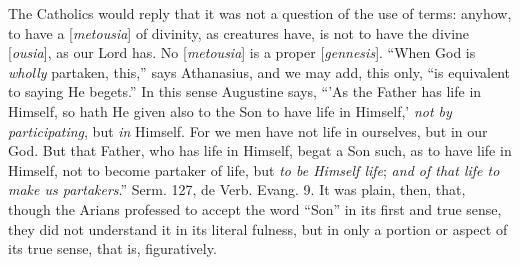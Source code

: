 The Catholics would reply that it was not a
question of the use of terms: anyhow, to have a [\emph{metousia}] of
divinity, as creatures have, is not to have the divine [\emph{ousia}],
as our Lord has. No [\emph{metousia}] is a proper [\emph{gennesis}]. ``When
God is \emph{wholly} partaken, this,'' says Athanasius, and we may add,
this only, ``is equivalent to saying He begets.'' In this sense
Augustine says, ``'As the Father has life in Himself, so hath He given
also to the Son to have life in Himself,' \emph{not by participating},
but \emph{in} Himself. For we men have not life in ourselves, but in
our God. But that Father, who has life in Himself, begat a Son such,
as to have life in Himself, not to become partaker of life, but \emph{to
be Himself life}; \emph{and of that life to make us partakers}.''
Serm. 127, de Verb. Evang. 9. It was plain, then, that, though the
Arians professed to accept the word ``Son'' in its first and true sense,
they did not understand it in its literal fulness, but in only a
portion or aspect of its true sense, that is, figuratively.

